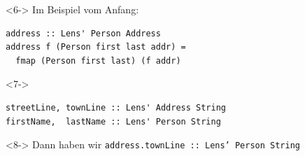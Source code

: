 \documentclass{beamer}
\newcommand{\hask}[1]{\texttt{#1}} %
\begin{document}
\begin{frame}[fragile]
  \begin{visibleenv}<6->
    Im Beispiel vom Anfang:
\begin{verbatim}
address :: Lens' Person Address
address f (Person first last addr) =
  fmap (Person first last) (f addr)
\end{verbatim}
  \end{visibleenv}
  \begin{visibleenv}<7->
\begin{verbatim}
streetLine, townLine :: Lens' Address String
firstName,  lastName :: Lens' Person String
\end{verbatim}
  \end{visibleenv}
  \begin{visibleenv}<8->
    Dann haben wir \enspace
    \hask{address.townLine :: Lens' Person String}
  \end{visibleenv}
\end{frame}
\end{document}
